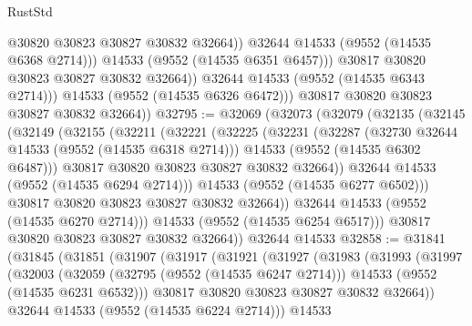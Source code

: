 \begin{lexlean}{RustStd}
\begin{coremodule}
                        @30820
                        @30823
                        @30827
                        @30832
                        @32664))
                    @32644
                    @14533
                    (@9552 (@14535 @6368 @2714)))
                  @14533
                  (@9552 (@14535 @6351 @6457)))
                @30817
                @30820
                @30823
                @30827
                @30832
                @32664))
            @32644
            @14533
            (@9552 (@14535 @6343 @2714)))
          @14533
          (@9552 (@14535 @6326 @6472)))
        @30817
        @30820
        @30823
        @30827
        @30832
        @32664))
@32795 := @32069
    (@32073
      (@32079
        (@32135
          (@32145
            (@32149
              (@32155
                (@32211
                  (@32221
                    (@32225
                      (@32231
                        (@32287
                          (@32730 @32644 @14533 (@9552 (@14535 @6318 @2714)))
                          @14533
                          (@9552 (@14535 @6302 @6487)))
                        @30817
                        @30820
                        @30823
                        @30827
                        @30832
                        @32664))
                    @32644
                    @14533
                    (@9552 (@14535 @6294 @2714)))
                  @14533
                  (@9552 (@14535 @6277 @6502)))
                @30817
                @30820
                @30823
                @30827
                @30832
                @32664))
            @32644
            @14533
            (@9552 (@14535 @6270 @2714)))
          @14533
          (@9552 (@14535 @6254 @6517)))
        @30817
        @30820
        @30823
        @30827
        @30832
        @32664))
    @32644
    @14533
@32858 := @31841
    (@31845
      (@31851
        (@31907
          (@31917
            (@31921
              (@31927
                (@31983
                  (@31993
                    (@31997
                      (@32003
                        (@32059
                          (@32795 (@9552 (@14535 @6247 @2714)))
                          @14533
                          (@9552 (@14535 @6231 @6532)))
                        @30817
                        @30820
                        @30823
                        @30827
                        @30832
                        @32664))
                    @32644
                    @14533
                    (@9552 (@14535 @6224 @2714)))
                  @14533

\end{coremodule}
\end{lexlean}
